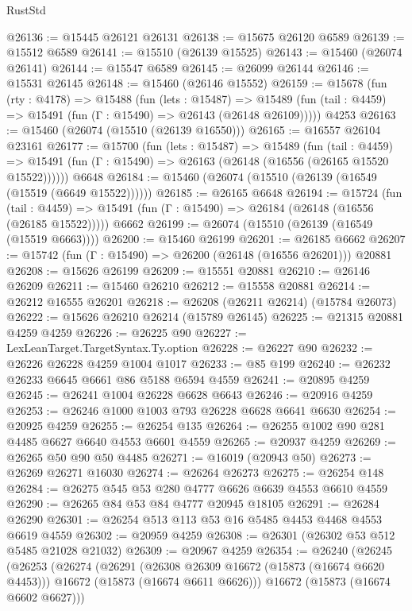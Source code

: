 \begin{lexlean}{RustStd}
\begin{coremodule}
@26136 := @15445 @26121 @26131
@26138 := @15675 @26120 @6589
@26139 := @15512 @6589
@26141 := @15510 (@26139 @15525)
@26143 := @15460 (@26074 @26141)
@26144 := @15547 @6589
@26145 := @26099 @26144
@26146 := @15531 @26145
@26148 := @15460 (@26146 @15552)
@26159 := @15678
    (fun (rty : @4178) =>
    @15488
      (fun (lets : @15487) =>
      @15489 (fun (tail : @4459) => @15491 (fun (Γ : @15490) => @26143 (@26148 @26109)))))
    @4253
@26163 := @15460 (@26074 (@15510 (@26139 @16550)))
@26165 := @16557 @26104 @23161
@26177 := @15700
    (fun (lets : @15487) =>
    @15489
      (fun (tail : @4459) =>
      @15491 (fun (Γ : @15490) => @26163 (@26148 (@16556 (@26165 @15520 @15522))))))
    @6648
@26184 := @15460 (@26074 (@15510 (@26139 (@16549 (@15519 (@6649 @15522))))))
@26185 := @26165 @6648
@26194 := @15724
    (fun (tail : @4459) => @15491 (fun (Γ : @15490) => @26184 (@26148 (@16556 (@26185 @15522)))))
    @6662
@26199 := @26074 (@15510 (@26139 (@16549 (@15519 @6663))))
@26200 := @15460 @26199
@26201 := @26185 @6662
@26207 := @15742 (fun (Γ : @15490) => @26200 (@26148 (@16556 @26201))) @20881
@26208 := @15626 @26199
@26209 := @15551 @20881
@26210 := @26146 @26209
@26211 := @15460 @26210
@26212 := @15558 @20881
@26214 := @26212 @16555 @26201
@26218 := @26208 (@26211 @26214) (@15784 @26073)
@26222 := @15626 @26210 @26214 (@15789 @26145)
@26225 := @21315 @20881 @4259 @4259
@26226 := @26225 @90
@26227 := LexLeanTarget.TargetSyntax.Ty.option
@26228 := @26227 @90
@26232 := @26226 @26228 @4259 @1004 @1017
@26233 := @85 @199
@26240 := @26232 @26233 @6645 @6661 @86 @5188 @6594 @4559
@26241 := @20895 @4259
@26245 := @26241 @1004 @26228 @6628 @6643
@26246 := @20916 @4259
@26253 := @26246 @1000 @1003 @793 @26228 @6628 @6641 @6630
@26254 := @20925 @4259
@26255 := @26254 @135
@26264 := @26255 @1002 @90 @281 @4485 @6627 @6640 @4553 @6601 @4559
@26265 := @20937 @4259
@26269 := @26265 @50 @90 @50 @4485
@26271 := @16019 (@20943 @50)
@26273 := @26269 @26271 @16030
@26274 := @26264 @26273
@26275 := @26254 @148
@26284 := @26275 @545 @53 @280 @4777 @6626 @6639 @4553 @6610 @4559
@26290 := @26265 @84 @53 @84 @4777 @20945 @18105
@26291 := @26284 @26290
@26301 := @26254 @513 @113 @53 @16 @5485 @4453 @4468 @4553 @6619 @4559
@26302 := @20959 @4259
@26308 := @26301 (@26302 @53 @512 @5485 @21028 @21032)
@26309 := @20967 @4259
@26354 := @26240
    (@26245
      (@26253
        (@26274
          (@26291
            (@26308 @26309 @16672 (@15873 (@16674 @6620 @4453)))
            @16672
            (@15873 (@16674 @6611 @6626)))
          @16672
          (@15873 (@16674 @6602 @6627)))

\end{coremodule}
\end{lexlean}

